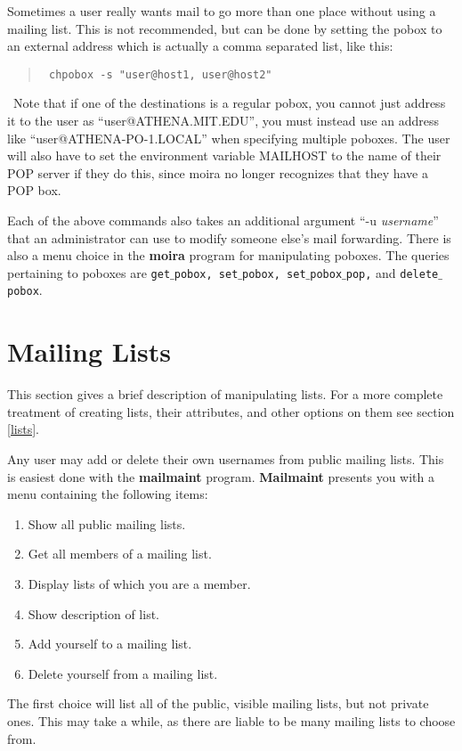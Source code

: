 Sometimes a user really wants mail to go more than one place
without using a mailing list.  This is not recommended, but can be
done by setting the pobox to an external address which is actually a
comma separated list, like this:
\begin{quotation}\tt
\noindent chpobox -s "user@host1, user@host2"
\end{quotation}
\athena\ Note that if one of the destinations is a regular pobox, you
cannot just address it to the user as ``user@ATHENA.MIT.EDU'', you
must instead use an address like ``user@ATHENA-PO-1.LOCAL'' when
specifying multiple poboxes.  The user will also have to set the
environment variable MAILHOST to the name of their POP server if they
do this, since moira no longer recognizes that they have a POP box.

Each of the above commands also takes an additional argument ``-u
{\em username}'' that an administrator can use to modify someone else's
mail forwarding.  There is also a menu choice in the {\bf moira} program
for manipulating poboxes.  The queries pertaining to poboxes are
{\tt get$\_$pobox, set$\_$pobox, set$\_$pobox$\_$pop,} and {\tt delete$\_$pobox}.

\section{Mailing Lists}

This section gives a brief description of manipulating lists.  For a
more complete treatment of creating lists, their attributes, and other
options on them see section \ref{lists}.

Any user may add or delete their own usernames from public mailing lists.
This is easiest done with the {\bf mailmaint} program.  {\bf Mailmaint}
presents you with a menu containing the following items:
\begin{enumerate}
\item Show all public mailing lists.
\item Get all members of a mailing list.
\item Display lists of which you are a member.
\item Show description of list.
\item Add yourself to a mailing list.
\item Delete yourself from a mailing list.
\end{enumerate}
The first choice will list all of the public, visible mailing lists,
but not private ones.  This may take a while, as there are liable to
be many mailing lists to choose from.

